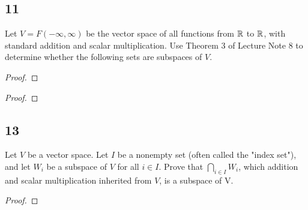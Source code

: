 \subsection*{11}
Let $V = F(-\infty, \infty)$ be the vector space of all functions from $\mathbb{R}$ to $\mathbb{R}$, with standard addition and scalar multiplication. Use Theorem 3 of Lecture Note 8 to determine whether the following sets are subspaces of $V$.
\begin{enumerate}
  \begin{proof}

  \end{proof}
  \begin{proof}

  \end{proof}
\end{enumerate}

\subsection*{13}
Let $V$ be a vector space. Let $I$ be a nonempty set (often called the "index set"), and let $W_i$ be a subspace of $V$ for all $i \in I$. Prove that $\bigcap_{i \in I} W_i$, which addition and scalar multiplication inherited from $V$, is a subspace of V.
\begin{proof}

\end{proof}

